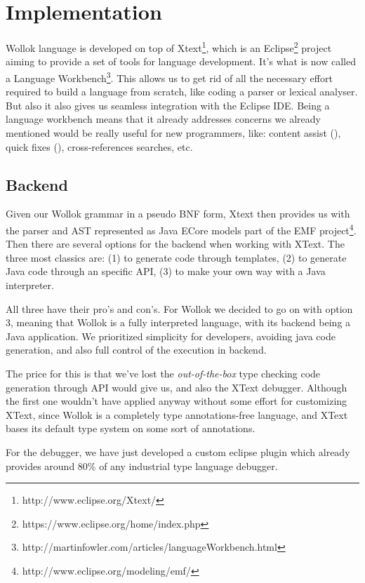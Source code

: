 \section{Implementation}
\label{sec:implementation}

Wollok language is developed on top of Xtext\footnote{http://www.eclipse.org/Xtext/}, which is an Eclipse\footnote{https://www.eclipse.org/home/index.php} project aiming to provide a set of tools for language development. It’s what is now called a Language Workbench\footnote{http://martinfowler.com/articles/languageWorkbench.html}.
This allows us to get rid of all the necessary effort required to build a language from scratch, like coding a parser or lexical analyser. But also it also gives us seamless integration with the Eclipse IDE. Being a language workbench means that it already addresses concerns we already mentioned would be really useful for new programmers, like: content assist (), quick fixes (), cross-references searches, etc.

\subsection{Backend}

Given our Wollok grammar in a pseudo BNF form, Xtext then provides us with the parser and AST represented as Java ECore models part of the EMF project\footnote{http://www.eclipse.org/modeling/emf/}. Then there are several options for the backend when working with XText. The three most classics are: (1) to generate code through templates, (2) to generate Java code through an specific API, (3) to make your own way with a Java interpreter.

All three have their pro’s and con’s. For Wollok we decided to go on with option 3, meaning that Wollok is a fully interpreted language, with its backend being a Java application.
We prioritized simplicity for developers, \eg avoiding java code generation, and also full control of the execution in backend. 

The price for this is that we’ve lost the \emph{out-of-the-box} type checking code generation through API would give us, and also the XText debugger.
Although the first one wouldn’t have applied anyway without some effort for
customizing XText, since Wollok is a completely type annotations-free language,
and XText bases its default type system on some sort of annotations.

For the debugger, we have just developed a custom eclipse plugin which already
provides around 80\% of any industrial type language debugger.

